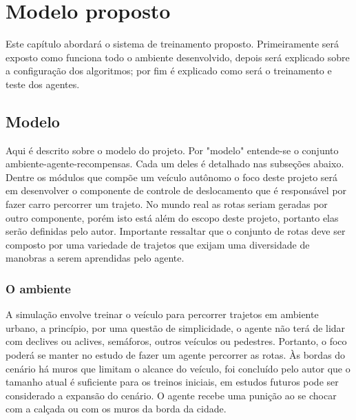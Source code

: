 \chapter{Modelo proposto}\label{cap:proposta}
Este capítulo abordará o sistema de treinamento proposto. Primeiramente será exposto como funciona todo o ambiente desenvolvido, depois será explicado sobre a configuração dos algoritmos; por fim é explicado como será o treinamento e teste dos agentes. 

\section{Modelo}\label{modelo}
Aqui é descrito sobre o modelo do projeto. Por "modelo"{} entende-se o conjunto ambiente-agente-recompensas. Cada um deles é detalhado nas subseções abaixo. Dentre os módulos que compõe um veículo autônomo o foco deste projeto será em desenvolver o componente de controle de deslocamento que é responsável por fazer carro percorrer um trajeto. No mundo real as rotas seriam geradas por outro componente, porém isto está além do escopo deste projeto, portanto elas serão definidas pelo autor. Importante ressaltar que o conjunto de rotas deve ser composto por uma variedade de trajetos que exijam uma diversidade de manobras a serem aprendidas pelo agente.

\subsection{O ambiente}
A simulação envolve treinar o veículo para percorrer trajetos em ambiente urbano, a princípio, por uma questão de simplicidade, o agente não terá de lidar com declives ou aclives, semáforos, outros veículos ou pedestres. Portanto, o foco poderá se manter no estudo de fazer um agente percorrer as rotas. Às bordas do cenário há muros que limitam o alcance do veículo, foi concluído pelo autor que o tamanho atual é suficiente para os treinos iniciais, em estudos futuros pode ser considerado a expansão do cenário. O agente recebe uma punição ao se chocar com a calçada ou com os muros da borda da cidade.

